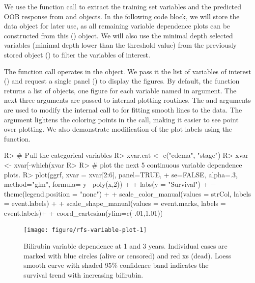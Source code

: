 \documentclass[nojss]{jss}\usepackage[]{graphicx}\usepackage[]{color}
\begin{document}
We use the  function call to extract the training set variables and the predicted OOB response from  and  objects. In the following code block, we will store the  data object for later use, as all remaining variable dependence plots can be constructed from this () object. We will also use the minimal depth selected variables (minimal depth lower than the threshold value) from the previously stored  object () to filter the variables of interest.

The  function call operates in the  object. We pass it the list of variables of interest () and request a single panel () to display the figures. By default, the  function returns a list of  objects, one figure for each variable named in  argument. The next three arguments are passed to internal  plotting routines. The  and  arguments are used to modify the internal call to  for fitting smooth lines to the data. The  argument lightens the coloring points in the  call, making it easier to see point over plotting. We also demonstrate modification of the plot labels using the  function.


\begin{Schunk}
\begin{Sinput}
R> # Pull the categorical variables
R> xvar.cat <- c("edema", "stage")
R> xvar <- xvar[-which(xvar %
R> 
R> # plot the next 5 continuous variable dependence plots.
R> plot(ggrf, xvar = xvar[2:6], panel=TRUE, 
+      se=FALSE, alpha=.3, method="glm", formula= y~ poly(x,2)) + 
+   labs(y = "Survival") + 
+   theme(legend.position = "none") + 
+   scale_color_manual(values = strCol, labels = event.labels) + 
+   scale_shape_manual(values = event.marks, labels = event.labels)+
+   coord_cartesian(ylim=c(-.01,1.01))
\end{Sinput}
\begin{figure}[!htpb]

{\centering \texttt{[image: figure/rfs-variable-plot-1]} 

}

\caption[Bilirubin variable dependence at 1 and 3 years]{Bilirubin variable dependence at 1 and 3 years. Individual cases are marked with blue circles (alive or censored) and red xs (dead). Loess smooth curve with shaded 95\% confidence band indicates the survival trend with increasing bilirubin.\label{fig:variable-plot}}
\end{figure}
\end{Schunk}
\end{document}
